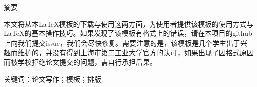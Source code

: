 \begin{center}
    \sffamily{}
    \TitleCN
\end{center}

\begin{center}
    \heiti{}
    摘要
\end{center}

本文将从本\LaTeX{}模板的下载与使用这两方面，为使用者提供该模板的使用方式与\LaTeX{}的基本操作技巧。如果发现了该模板有格式上的错误，请在本项目的{\ttfamily github}上向我们提交{\ttfamily issue}，我们会尽快修复。需要注意的是，该模板是几个学生出于兴趣而维护的，并没有得到上海市第二工业大学官方的认可，如果出现了因格式原因而被学校拒绝论文提交的问题，需自行承担后果。

{\noindent\heiti 关键词：}论文写作；模板；排版
\newpage